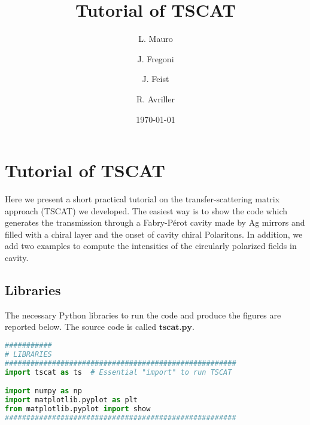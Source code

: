 \documentclass[showpacs,aps,prl,onecolumn,superscriptaddress]{revtex4-1}
\begin{document}
\title{Tutorial of TSCAT}



\author{L. Mauro}
\author{J. Fregoni}
\author{J. Feist}
\author{R. Avriller}

\date{\today}

\maketitle
\section{Tutorial of TSCAT}
\label{tscatSec}
Here we present a short practical tutorial on the transfer-scattering matrix approach (TSCAT) we developed. The easiest way is to show the code which generates the transmission through a  Fabry-P\'erot cavity made by Ag mirrors and filled with a chiral layer and the onset of cavity chiral Polaritons. In addition, we add two examples to compute the intensities of the circularly polarized fields in cavity.
\subsection{Libraries}
The necessary Python libraries to run the code and produce the figures are reported below. The source code is called $\mathbf{tscat.py}$.
\begin{lstlisting}[language=Python, caption=Necessary Python libraries.]
###########
# LIBRARIES
######################################################
import tscat as ts  # Essential "import" to run TSCAT

import numpy as np
import matplotlib.pyplot as plt
from matplotlib.pyplot import show
######################################################
\end{lstlisting}
\end{document}
